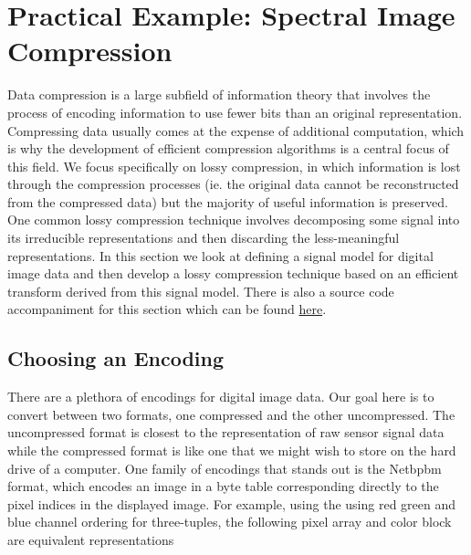 \documentclass[12pt,technote]{IEEEtran}
\begin{document}
\section{Practical Example: Spectral Image Compression}
Data compression is a large subfield of information theory that involves the process of encoding information to use fewer bits than an original representation. Compressing data usually comes at the expense of additional computation, which is why the development of efficient compression algorithms is a central focus of this field. We focus specifically on lossy compression, in which information is lost through the compression processes (ie. the original data cannot be reconstructed from the compressed data) but the majority of useful information is preserved. One common lossy compression technique involves decomposing some signal into its irreducible representations and then discarding the less-meaningful representations. In this section we look at defining a signal model for digital image data and then develop a lossy compression technique based on an efficient transform derived from this signal model. There is also a source code accompaniment for this section which can be found \href{https://github.com/henry-2025/math189-spectral-compression}{here}.

\subsection{Choosing an Encoding}
There are a plethora of encodings for digital image data. Our goal here is to convert between two formats, one compressed and the other uncompressed. The uncompressed format is closest to the representation of raw sensor signal data while the compressed format is like one that we might wish to store on the hard drive of a computer. One family of encodings that stands out is the Netbpbm format, which encodes an image in a byte table corresponding directly to the pixel indices in the displayed image. For example, using the using red green and blue channel ordering for three-tuples, the following pixel array and color block are equivalent representations
\end{document}
